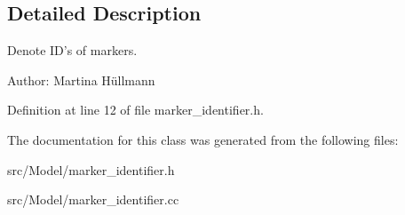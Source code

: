 \subsection{Detailed Description}
Denote ID's of markers. 

\begin{Desc}
\item[Author:]Martina Hüllmann \end{Desc}


Definition at line 12 of file marker\_\-identifier.h.

The documentation for this class was generated from the following files:\begin{CompactItemize}
\item 
src/Model/marker\_\-identifier.h\item 
src/Model/marker\_\-identifier.cc\end{CompactItemize}
